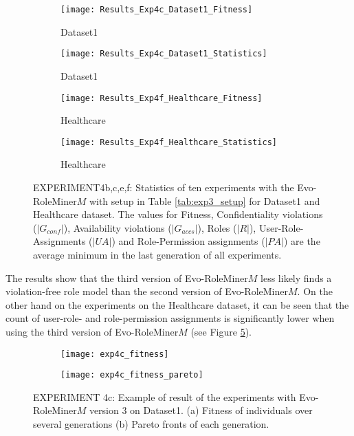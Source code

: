 \begin{figure}[H]
	\centering
	\begin{subfigure}{0.45\textwidth}
		\texttt{[image: Results\_Exp4c\_Dataset1\_Fitness]}
		\caption{Dataset1}
		\label{fig:Results_Exp4c_Dataset1_Fitness}
	\end{subfigure}%
	\begin{subfigure}{0.55\textwidth}
		\centering
		\texttt{[image: Results\_Exp4c\_Dataset1\_Statistics]}
		\caption{Dataset1}
		\label{fig:Results_Exp4c_Dataset1_Statistics}
	\end{subfigure}
	\begin{subfigure}{0.45\textwidth}
		\texttt{[image: Results\_Exp4f\_Healthcare\_Fitness]}
		\caption{Healthcare}
		\label{fig:Results_Exp4f_Healthcare_Fitness}
	\end{subfigure}%
	\begin{subfigure}{0.55\textwidth}
		\centering
		\texttt{[image: Results\_Exp4f\_Healthcare\_Statistics]}
		\caption{Healthcare}
		\label{fig:Results_Exp4f_Healthcare_Statistics}
	\end{subfigure}
	\caption{EXPERIMENT4b,c,e,f: Statistics of ten experiments with the Evo-RoleMiner$M$ with setup in Table \ref{tab:exp3_setup} for Dataset1 and Healthcare dataset. The values for Fitness, Confidentiality violations ($|G_{conf}|$), Availability violations ($|G_{accs}|$), Roles ($|R|$), User-Role-Assignments ($|UA|$) and Role-Permission assignments ($|PA|$) are the average minimum in the last generation of all experiments.}
	\label{fig:Results_Exp4}
\end{figure}

The results show that the third version of Evo-RoleMiner$M$ less likely finds a violation-free role model than the second version of Evo-RoleMiner$M$. On the other hand on the experiments on the Healthcare dataset, it can be seen that the count of user-role- and role-permission assignments is significantly lower when using the third version of Evo-RoleMiner$M$ (see Figure \ref{fig:Results_Exp4}).

\begin{figure}[H]
	\centering
	\begin{subfigure}{\textwidth}
		\centering
		\texttt{[image: exp4c\_fitness]}
		\caption{}
		\label{fig:exp4c_fitness_A}
	\end{subfigure}
	\begin{subfigure}{\textwidth}
		\centering
		\texttt{[image: exp4c\_fitness\_pareto]}
		\caption{}
		\label{fig:exp4c_fitness_B}
	\end{subfigure}
	\caption{EXPERIMENT 4c: Example of result of the experiments with Evo-RoleMiner$M$ version 3 on Dataset1. (a) Fitness of individuals over several generations (b) Pareto fronts of each generation.}
	\label{fig:exp4c_fitness}
\end{figure}

